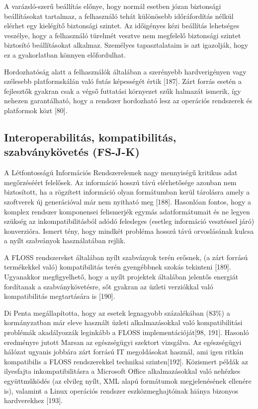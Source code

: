 \documentclass[12pt,magyar,a4paper,oneside]{scrreprt}
\begin{document}
A varázsló-szerű beállítás előnye, hogy normál esetben józan biztonsági
beállításokat tartalmaz, a felhasználó tehát különösebb időráfordítás
nélkül elérhet egy kielégítő biztonsági szintet. Az időigényes kézi
beállítás lehetséges veszélye, hogy a felhasználó türelmét vesztve nem
megfelelő biztonsági szintet biztosító beállításokat alkalmaz. Személyes
tapasztalataim is azt igazolják, hogy ez a gyakorlatban könnyen
előfordulhat.

Hordozhatóság alatt a felhasználók általában a szerényebb hardverigényen
vagy szélesebb platformskálán való futás képességét értik {[}187{]}.
Zárt forrás esetén a fejlesztők gyakran csak a végső futtatási környezet
szűk halmazát ismerik, így nehezen garantálható, hogy a rendszer
hordozható lesz az operációs rendszerek és platformok közt {[}80{]}.

\hypertarget{sec:FS-J-K}{%
\subsection{Interoperabilitás, kompatibilitás, szabványkövetés
(FS-J-K)}\label{sec:FS-J-K}}

A Létfontosságú Információs Rendszerelemek nagy mennyiségű kritikus adat
megőrzéséért felelősek. Az információ hosszú távú elérhetősége azonban
nem biztosított, ha a rögzített információ olyan formátumban kerül
tárolásra amely a szoftverek új generációval már nem nyitható meg
{[}188{]}. Hasonlóan fontos, hogy a komplex rendszer komponensei
felismerjék egymás adatformátumait és ne legyen szükség az
inkompatibilitásból adódó felesleges (esetleg információ vesztéssel
járó) konverzióra. Ismert tény, hogy mindkét probléma hosszú távú
orvoslásának kulcsa a nyílt szabványok használatában rejlik.

A FLOSS rendszereket általában nyílt szabványok terén erősnek, (a zárt
forrású termékekkel való) kompatibilitás terén gyengébbnek szokás
tekinteni {[}189{]}. Ugyanakkor megfigyelhető, hogy a nyílt projektek
általában jelentős energiát fordítanak a szabványkövetésre, sőt gyakran
az üzleti verziókkal való kompatibilitás megtartására is {[}190{]}.

Di Penta megállapította, hogy az esetek legnagyobb százalékában (83\%) a
kormányzatban már eleve használt üzleti alkalmazásokkal való
kompatibilitási problémák akadályozzák leginkább a FLOSS
implementációját{[}98, 191{]}. Hasonló eredményre jutott Marsan az
egészségügyi szektort vizsgálva. Az egészségügyi hálózat ugyanis jobbára
zárt forrású IT megoldásokat használ, ami igen ritkán kompatibilis a
FLOSS rendszerekkel technikai szinten{[}192{]}. Közismert példák az
ilyesfajta inkompatibilitásra a Microsoft Office alkalmazásokkal való
nehézkes együttműködés (az elvileg nyílt, XML alapú formátumok
megjelenésének ellenére is), valamint a Linux operációs rendszer
eszközmeghajtóinak hiánya bizonyos hardverekhez {[}193{]}.
\end{document}
